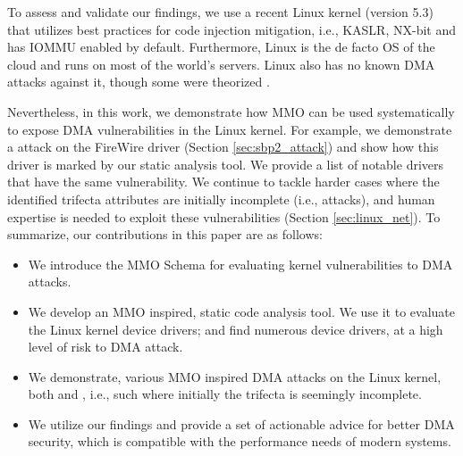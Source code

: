 To assess and validate our findings, we use a recent Linux kernel (version 5.3) that utilizes best practices for code injection mitigation, i.e., KASLR, NX-bit and has IOMMU enabled by default. Furthermore, Linux is the de facto OS of the cloud and runs on most of the world's servers. Linux also has no known DMA attacks against it, though some were theorized \cite{MMT16,thunder}. 

Nevertheless, in this work, we demonstrate how MMO can be used systematically to expose DMA vulnerabilities in the Linux kernel. For example, we demonstrate a \simple{} attack on the FireWire \spb{} driver (Section \ref{sec:sbp2_attack}) and show how this driver is marked by our static analysis tool. We provide a list of notable drivers that have the same vulnerability. We continue to tackle harder cases where the identified trifecta attributes are initially incomplete (i.e., \compound{} attacks), and human expertise is needed to exploit these vulnerabilities (Section \ref{sec:linux_net}). To summarize, our contributions in this paper are as follows:
\begin{itemize}
    \item We introduce the MMO Schema for evaluating kernel vulnerabilities to DMA attacks. 
    \item We develop an MMO inspired, static code analysis tool. We use it to evaluate the Linux kernel device drivers; and find numerous device drivers, at a high level of risk to DMA attack.
    \item We demonstrate, various MMO inspired DMA attacks on the Linux kernel, both \simple{} and \compound{}, i.e., such where initially the trifecta is seemingly incomplete. 
    \item We utilize our findings and provide a set of actionable advice for better DMA security, which is compatible with the performance needs of modern systems.
\end{itemize}